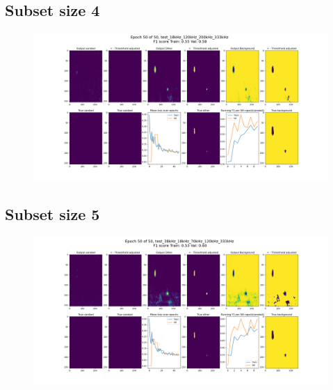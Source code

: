     \subsection{Subset size 4}
        \begin{figure}[H]

            \hspace*{-3.2cm}
            \includegraphics[scale=0.45]{figures/epoch_50_test_18kHz_120kHz_200kHz_333kHz.png}

          	\medskip 
        \end{figure}
    \clearpage
    \subsection{Subset size 5} \label{appendix:subset size 5}
        \begin{figure}[H]

            \hspace*{-3.2cm}
            \includegraphics[scale=0.45]{figures/epoch_50_test_38kHz_18kHz_70kHz_120kHz_333kHz.png}

          	\medskip 
        \end{figure}
